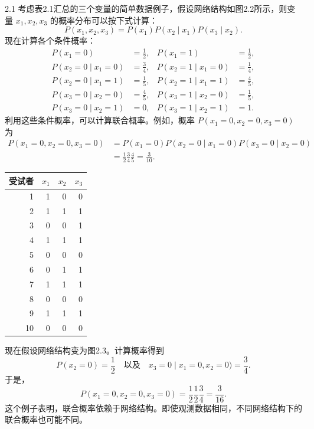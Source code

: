 \begin{bookexample}{2.1}
考虑表2.1汇总的三个变量的简单数据例子，假设网络结构如图2.2所示，则变量 $x_1,x_2,x_3$ 的概率分布可以按下式计算：
\begin{equation}
P(x_1,x_2,x_3)=P(x_1)P(x_2\mid x_1)P(x_3\mid x_2).
\tag{2.12}
\end{equation}
现在计算各个条件概率：
\[
\begin{aligned}
P(x_1=0)&=\frac12,&P(x_1=1)&=\frac12,\\
P(x_2=0\mid x_1=0)&=\frac34,&P(x_2=1\mid x_1=0)&=\frac14,\\
P(x_2=0\mid x_1=1)&=\frac15,&P(x_2=1\mid x_1=1)&=\frac45,\\
P(x_3=0\mid x_2=0)&=\frac45,&P(x_3=1\mid x_2=0)&=\frac15,\\
P(x_3=0\mid x_2=1)&=0,&P(x_3=1\mid x_2=1)&=1.
\end{aligned}
\]
利用这些条件概率，可以计算联合概率。例如，概率 $P(x_1=0,x_2=0,x_3=0)$ 为
\begin{equation}
\begin{aligned}
P(x_1=0,x_2=0,x_3=0)
 &=P(x_1=0)P(x_2=0\mid x_1=0)P(x_3=0\mid x_2=0)\\
 &=\frac12\frac34\frac45=\frac3{10}.
\end{aligned}\tag{2.13}
\end{equation}
\begin{table}[htbp]
\centering
{}
\begin{tabular}{rrrr}
\toprule
受试者&$x_1$&$x_2$&$x_3$\\
\midrule
1&1&0&0\\2&1&1&1\\3&0&0&1\\4&1&1&1\\5&0&0&0\\
6&0&1&1\\7&1&1&1\\8&0&0&0\\9&1&1&1\\10&0&0&0\\
\bottomrule
\end{tabular}
\end{table}
\begin{figure}[htbp]
\centering
{}
\end{figure}
现在假设网络结构变为图2.3。计算概率得到
\[
P(x_2=0)=\frac12
\quad\text{以及}\quad x_3=0\mid x_1=0,x_2=0)=\frac34.
\]
于是，
\[
P(x_1=0,x_2=0,x_3=0)=\frac12\frac12\frac34=\frac3{16}.
\]
这个例子表明，联合概率依赖于网络结构。即使观测数据相同，不同网络结构下的联合概率也可能不同。
\begin{figure}[htbp]
\centering
{}
\end{figure}
\end{bookexample}
\FloatBarrier
